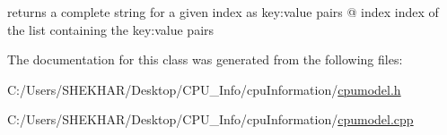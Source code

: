 returns a complete string for a given index as key\+:value pairs @ index index of the list containing the key\+:value pairs 

The documentation for this class was generated from the following files\+:\begin{DoxyCompactItemize}
\item 
C\+:/\+Users/\+S\+H\+E\+K\+H\+A\+R/\+Desktop/\+C\+P\+U\+\_\+\+Info/cpu\+Information/\hyperlink{cpumodel_8h}{cpumodel.\+h}\item 
C\+:/\+Users/\+S\+H\+E\+K\+H\+A\+R/\+Desktop/\+C\+P\+U\+\_\+\+Info/cpu\+Information/\hyperlink{cpumodel_8cpp}{cpumodel.\+cpp}\end{DoxyCompactItemize}
